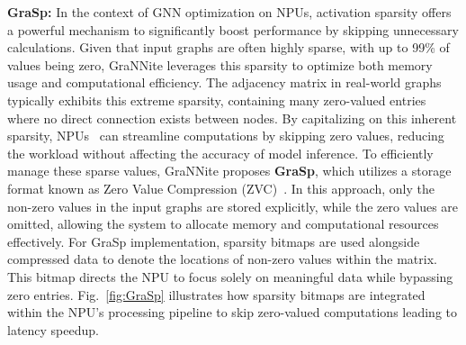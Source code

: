 


\textbf{GraSp:} In the context of GNN optimization on NPUs, activation sparsity offers a powerful mechanism to significantly boost performance by skipping unnecessary calculations. Given that input graphs are often highly sparse, with up to 99\% of values being zero, GraNNite leverages this sparsity to optimize both memory usage and computational efficiency. The adjacency matrix in real-world graphs typically exhibits this extreme sparsity, containing many zero-valued entries where no direct connection exists between nodes. By capitalizing on this inherent sparsity, NPUs~\cite{lnl, mtl} can streamline computations by skipping zero values, reducing the workload without affecting the accuracy of model inference.
To efficiently manage these sparse values, GraNNite proposes \textbf{GraSp}, which utilizes a storage format known as Zero Value Compression (ZVC)~\cite{zvc}. In this approach, only the non-zero values in the input graphs are stored explicitly, while the zero values are omitted, allowing the system to allocate memory and computational resources effectively. For GraSp implementation, sparsity bitmaps are used alongside compressed data to denote the locations of non-zero values within the matrix. This bitmap directs the NPU to focus solely on meaningful data while bypassing zero entries.
Fig.~\ref{fig:GraSp} illustrates how sparsity bitmaps are integrated within the NPU’s processing pipeline to skip zero-valued computations leading to latency speedup.






